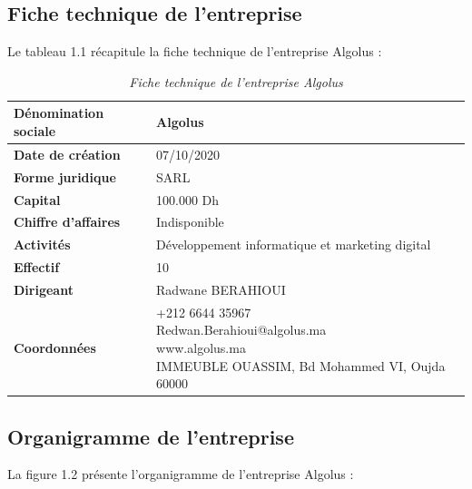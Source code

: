 \documentclass[12pt,a4paper]{report}
\begin{document}
	\subsection{Fiche technique de l'entreprise}
	
	Le tableau 1.1 récapitule la fiche technique de l'entreprise Algolus :
	
	\begin{table}[H]
		\centering
		\caption{\textit{Fiche technique de l'entreprise Algolus}}
		\begin{tabular}{|l|l|}
			\hline
			\textbf{Dénomination sociale} & Algolus \\
			\hline
			\textbf{Date de création} & 07/10/2020 \\
			\hline
			\textbf{Forme juridique} & SARL \\
			\hline
			\textbf{Capital} & 100.000 Dh \\
			\hline
			\textbf{Chiffre d'affaires} & Indisponible \\
			\hline
			\textbf{Activités} & Développement informatique et marketing digital \\
			\hline
			\textbf{Effectif} & 10 \\
			\hline
			\textbf{Dirigeant} & Radwane BERAHIOUI \\
			\hline
			\textbf{Coordonnées} & \makecell[l]{+212 6644 35967 \\ Redwan.Berahioui@algolus.ma \\ www.algolus.ma \\ IMMEUBLE OUASSIM, Bd Mohammed VI, Oujda 60000} \\
			\hline
		\end{tabular}
		\label{tab:fiche-technique-algolus}  %
	\end{table}
	
	\subsection{Organigramme de l’entreprise}
	
	La figure 1.2 présente l'organigramme de l'entreprise Algolus :
	
\end{document}
